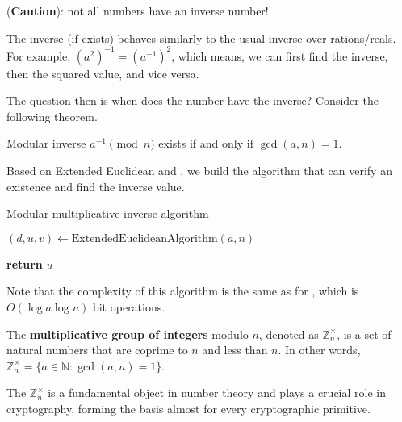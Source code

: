 \documentclass[../lecture-notes-148x210.tex]{subfiles}
\begin{document}
\begin{remark}
    (\textbf{Caution}): not all numbers have an inverse number!
\end{remark}

\begin{remark}
    The inverse (if exists) behaves similarly to the usual inverse over rations/reals. For example, $(a^{2})^{-1} = (a^{-1})^{2}$, which means, we can first find the inverse, then the squared value, and vice versa.
\end{remark}

The question then is when does the number have the inverse? Consider the following theorem.

\begin{theorem}\label{th:inverse_existence}
    Modular inverse $a^{-1} \pmod{n}$ exists if and only if $\gcd(a, n) = 1$.
\end{theorem}

Based on Extended Euclidean  and , we build the algorithm that can verify an existence and find the inverse value.

\begin{algorithm}
    \caption{Modular multiplicative inverse algorithm} \label{alg:modular_inverse}
        
    $(d, u, v) \gets \text{ExtendedEuclideanAlgorithm}(a, n)$ 


    \textbf{return} $u$
\end{algorithm}

\begin{remark}
    Note that the complexity of this algorithm is the same as for , which is $O(\log a \log n)$ bit operations.
\end{remark}

\begin{definition}
    The \textbf{multiplicative group of integers} modulo $n$, denoted as $\mathbb{Z}_n^{\times}$, is a set of natural numbers that are coprime to $n$ and less than $n$. In other words, $\mathbb{Z}_n^{\times} = \{a \in \mathbb{N}: \gcd(a, n) = 1\}$.
\end{definition}

The $\mathbb{Z}_{n}^{\times}$ is a fundamental object in number theory and 
plays a crucial role in cryptography, forming the basis almost for every cryptographic primitive.
\end{document}
